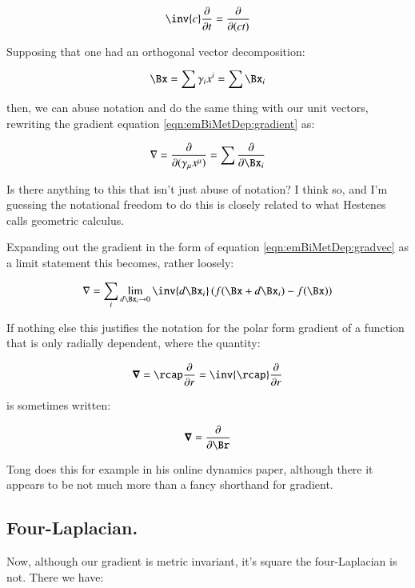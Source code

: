 \begin{equation*}
\inv{c} \PD{t}{} = \PD{(ct)}{}
\end{equation*}

Supposing that one had an orthogonal vector decomposition:

\begin{equation*}
\Bx = \sum \gamma_i x^i = \sum \Bx_i
\end{equation*}

then, we can abuse notation and do the same thing with our unit vectors, rewriting the gradient equation \ref{eqn:emBiMetDep:gradient} as:

\begin{equation}\label{eqn:emBiMetDep:gradvec}
\grad = \PD{(\gamma_{\mu} x^{\mu})}{} = \sum \PD{\Bx_i}{}
\end{equation}

Is there anything to this that isn't just abuse of notation?  I think so, and I'm guessing the notational freedom to do this is closely related to
what Hestenes calls geometric calculus.

Expanding out the gradient in the form of equation \ref{eqn:emBiMetDep:gradvec} as a limit statement this becomes, rather loosely:

\begin{equation*}
\grad = \sum_i \lim_{d\Bx_i \to 0} \inv{ d \Bx_i } \left(f( \Bx + d\Bx_i ) - f( \Bx )\right)
\end{equation*}

If nothing else this justifies the notation for the polar form gradient of a function that is only radially dependent, where the quantity:

\begin{equation*}
\spacegrad = \rcap\PD{r}{} = \inv{\rcap}\PD{r}{}
\end{equation*}

is sometimes written:

\begin{equation*}
\spacegrad = \PD{\Br}{}
\end{equation*}

Tong does this for example in his online dynamics paper, although there it appears to be not much more than a fancy shorthand for gradient.

\subsection{Four-Laplacian. }

Now, although our gradient is metric invariant, it's square the four-Laplacian is not.  There we have:

